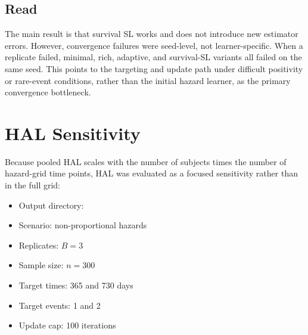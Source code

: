 \documentclass[11pt]{article}
\begin{document}
\begin{table}[H]
\centering
\caption{Risk-difference performance in the survival-SL no-HAL grid, averaged over events and target times.}
\scriptsize
\resizebox{\textwidth}{!}{%

}
\end{table}

\subsection*{Read}

The main result is that survival SL works and does not introduce new estimator errors. However, convergence failures were seed-level, not learner-specific. When a replicate failed, minimal, rich, adaptive, and survival-SL variants all failed on the same seed. This points to the targeting and update path under difficult positivity or rare-event conditions, rather than the initial hazard learner, as the primary convergence bottleneck.

\section{HAL Sensitivity}

Because pooled HAL scales with the number of subjects times the number of hazard-grid time points, HAL was evaluated as a focused sensitivity rather than in the full grid:

\begin{itemize}
  \item Output directory: 
  \item Scenario: non-proportional hazards
  \item Replicates: \(B = 3\)
  \item Sample size: \(n = 300\)
  \item Target times: 365 and 730 days
  \item Target events: 1 and 2
  \item Update cap: 100 iterations
\end{itemize}

\begin{table}[H]
\centering
\caption{HAL sensitivity diagnostics.}
\small
\resizebox{\textwidth}{!}{%

}
\end{table}

\begin{table}[H]
\centering
\caption{HAL sensitivity absolute-risk performance.}
\small
\resizebox{\textwidth}{!}{%

}
\end{table}
\end{document}
